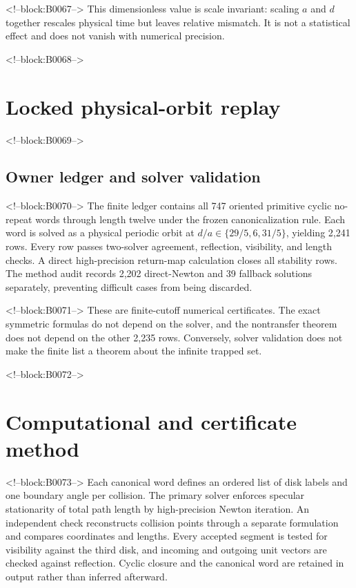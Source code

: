 \documentclass[11pt,a4paper]{article}
\theoremstyle{definition}
\theoremstyle{remark}
\begin{document}
<!--block:B0067-->
This dimensionless value is scale invariant: scaling \(a\) and \(d\) together rescales physical time but leaves relative mismatch. It is not a statistical effect and does not vanish with numerical precision.

<!--block:B0068-->
\section{Locked physical-orbit replay}

<!--block:B0069-->
\subsection{Owner ledger and solver validation}

<!--block:B0070-->
The finite ledger contains all 747 oriented primitive cyclic no-repeat words through length twelve under the frozen canonicalization rule. Each word is solved as a physical periodic orbit at \(d/a\in\{29/5,6,31/5\}\), yielding 2,241 rows. Every row passes two-solver agreement, reflection, visibility, and length checks. A direct high-precision return-map calculation closes all stability rows. The method audit records 2,202 direct-Newton and 39 fallback solutions separately, preventing difficult cases from being discarded.

<!--block:B0071-->
These are finite-cutoff numerical certificates. The exact symmetric formulas do not depend on the solver, and the nontransfer theorem does not depend on the other 2,235 rows. Conversely, solver validation does not make the finite list a theorem about the infinite trapped set.

<!--block:B0072-->
\section{Computational and certificate method}

<!--block:B0073-->
Each canonical word defines an ordered list of disk labels and one boundary angle per collision. The primary solver enforces specular stationarity of total path length by high-precision Newton iteration. An independent check reconstructs collision points through a separate formulation and compares coordinates and lengths. Every accepted segment is tested for visibility against the third disk, and incoming and outgoing unit vectors are checked against reflection. Cyclic closure and the canonical word are retained in output rather than inferred afterward.
\end{document}
